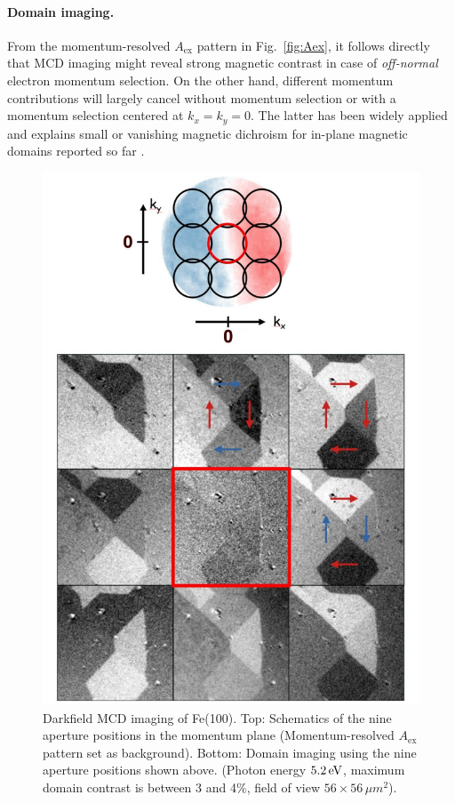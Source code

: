 \documentclass[prl,twocolumn,floatfix]{revtex4-2}
\begin{document}
\paragraph{Domain imaging.} 

From the momentum-resolved $A_{\mathrm{ex}}$ pattern in Fig.~\ref{fig:Aex}, it follows directly that MCD imaging might reveal strong magnetic contrast in case of \textit{off-normal} electron momentum selection. On the other hand, different momentum contributions will largely cancel without momentum selection or with a momentum selection centered at $k_x=k_y=0$. The latter has been widely applied and explains small or vanishing magnetic dichroism for in-plane magnetic domains reported so far \cite{marx2000}.
\begin{figure}
    \centering
    \includegraphics[width = 0.7\columnwidth]{Darkfield_overview.pdf}
    \caption{Darkfield MCD imaging of Fe(100). Top: Schematics of the nine aperture positions in the momentum plane (Momentum-resolved $A_{\mathrm{ex}}$ pattern set as background). Bottom: Domain imaging using the nine aperture positions shown above. (Photon energy $\unit[5.2]{eV}$, 
    maximum domain contrast is between 3 and 4$\%$, field of view $56\times56\,\mu m^2$).}
    \label{fig:Imaging}
\end{figure}
\end{document}
